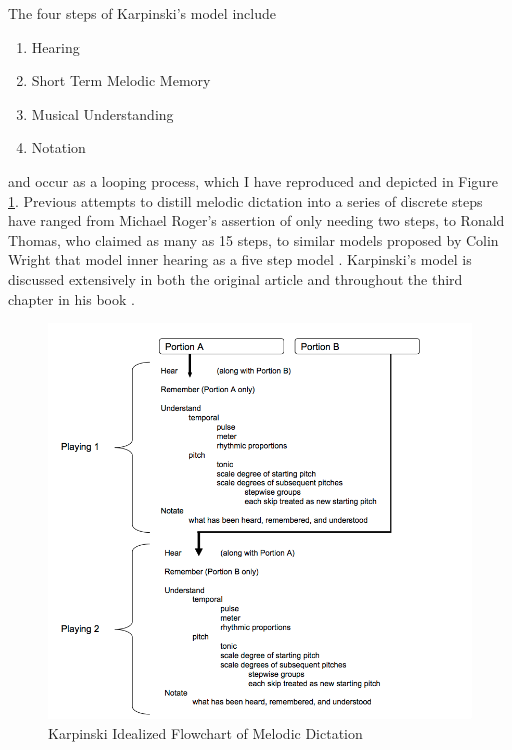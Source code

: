 \documentclass[12pt,]{book}
\providecommand{\tightlist}{%
  \setlength{\itemsep}{0pt}\setlength{\parskip}{0pt}}
\begin{document}
The four steps of Karpinski's model include

\begin{enumerate}
\def\labelenumi{\arabic{enumi}.}
\tightlist
\item
  Hearing
\item
  Short Term Melodic Memory
\item
  Musical Understanding
\item
  Notation
\end{enumerate}

and occur as a looping process, which I have reproduced and depicted in Figure \ref{fig:flowchart}.
Previous attempts to distill melodic dictation into a series of discrete steps have ranged from Michael Roger's assertion of only needing two steps, to Ronald Thomas, who claimed as many as 15 steps, to similar models proposed by Colin Wright that model inner hearing as a five step model \citep{wrightInvestigatingAuralCase2016, karpinskiAuralSkillsAcquisition2000}.
Karpinski's model is discussed extensively in both the original article \citep{karpinskiModelMusicPerception1990} and throughout the third chapter in his book \citep{karpinskiAuralSkillsAcquisition2000}.

\begin{figure}

{\centering \includegraphics[width=1\linewidth]{img/karpinski31} 

}

\caption{Karpinski Idealized Flowchart of Melodic Dictation}\label{fig:flowchart}
\end{figure}
\end{document}
